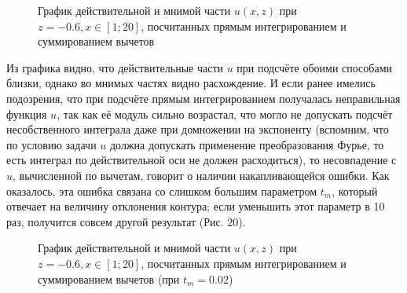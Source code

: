 \documentclass[a4paper, 12pt]{article}
\begin{document}
\begin{figure}[h!]
    \noindent{}
    \caption{График действительной и мнимой части $u(x,z)$ при $z=-0.6, x \in [1;20]$, посчитанных прямым интегрированием и суммированием вычетов}
    \label{figCurves}
    \end{figure}

Из графика видно, что действительные части $u$ при подсчёте обоими способами близки, однако во мнимых частях видно расхождение. И если ранее имелись подозрения, что при подсчёте прямым интегрированием получалась неправильная функция $u$, так как её модуль сильно возрастал, что могло не допускать подсчёт несобственного интеграла даже при домножении на экспоненту (вспомним, что по условию задачи $u$ должна допускать применение преобразования Фурье, то есть интеграл по действительной оси не должен расходиться), то несовпадение с $u$, вычисленной по вычетам, говорит о наличии накапливающейся ошибки. Как оказалось, эта ошибка связана со слишком большим параметром $t_m$, который отвечает на величину отклонения контура; если уменьшить этот параметр в 10 раз, получится совсем другой результат (Рис. 20).

\begin{figure}[h!]
\noindent{}
\caption{График действительной и мнимой части $u(x,z)$ при $z=-0.6, x \in [1;20]$, посчитанных прямым интегрированием и суммированием вычетов (при $t_m=0.02$)}
\label{figCurves}
\end{figure}
\end{document}
